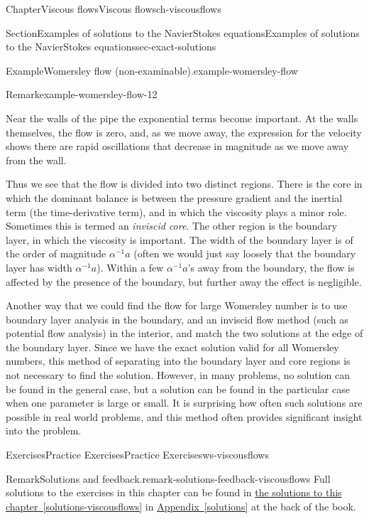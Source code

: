 \documentclass[oneside,10pt,]{book}
\newcommand{\xreffont}{\relax}
\numberwithin{equation}{section}
\begin{document}
\begin{chapterptx}{Chapter}{Viscous flows}{}{Viscous flows}{}{}{ch-viscousflows}
\begin{sectionptx}{Section}{Examples of solutions to the Navier\textendash{}Stokes equations}{}{Examples of solutions to the Navier\textendash{}Stokes equations}{}{}{sec-exact-solutions}
\begin{example}{Example}{Womersley flow (non-examinable).}{example-womersley-flow}
\begin{remark}{Remark}{}{example-womersley-flow-12}
\par
Near the walls of the pipe the exponential terms become important. At the walls themselves, the flow is zero, and, as we move away, the expression for the velocity shows there are rapid oscillations that decrease in magnitude as we move away from the wall.%
\par
Thus we see that the flow is divided into two distinct regions. There is the core in which the dominant balance is between the pressure gradient and the inertial term (the time-derivative term), and in which the viscosity plays a minor role. Sometimes this is termed an \emph{inviscid core}. The other region is the boundary layer, in which the viscosity is important. The width of the boundary layer is of the order of magnitude \(\alpha^{-1}a\) (often we would just say loosely that the boundary layer has width \(\alpha^{-1}a\)). Within a few \(\alpha^{-1}a\)'s away from the boundary, the flow is affected by the presence of the boundary, but further away the effect is negligible.%
\par
Another way that we could find the flow for large Womersley number is to use boundary layer analysis in the boundary, and an inviscid flow method (such as potential flow analysis) in the interior, and match the two solutions at the edge of the boundary layer. Since we have the exact solution valid for all Womersley numbers, this method of separating into the boundary layer and core regions is not necessary to find the solution. However, in many problems, no solution can be found in the general case, but a solution can be found in the particular case when one parameter is large or small. It is surprising how often such solutions are possible in real world problems, and this method often provides significant insight into the problem.%
\end{remark}
\end{example}
\end{sectionptx}
%
%
\typeout{************************************************}
\typeout{************************************************}
%
\begin{exercises-section}{Exercises}{Practice Exercises}{}{Practice Exercises}{}{}{ws-viscousflows}
\begin{introduction}{}%
\begin{remark}{Remark}{Solutions and feedback.}{remark-solutions-feedback-viscousflows}%
Full solutions to the exercises in this chapter can be found in \hyperref[solutions-viscousflows]{the solutions to this chapter~{\xreffont\ref{solutions-viscousflows}}} in \hyperref[solutions]{Appendix~{\xreffont\ref{solutions}}} at the back of the book.%

\end{remark}
\end{introduction}
\end{exercises-section}
\end{chapterptx}
\end{document}

